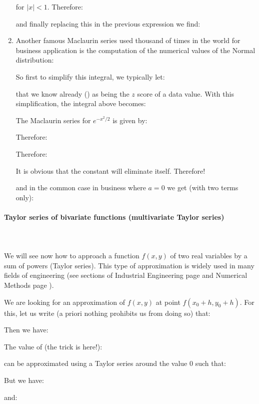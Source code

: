 \begin{enumerate}
		for $\vert x \vert < 1$. Therefore:
		
		and finally replacing this in the previous expression we find:
		
		
		\item  Another famous Maclaurin series used thousand of times in the world for business application is the computation of the numerical values of the Normal distribution:
		
		So first to simplify this integral, we typically let:
		
		that we know already () as being the $z$ score of a data value. With this simplification, the integral above becomes:
		
		The Maclaurin series for $e^{-x^2/2}$ is given by:
		
		Therefore:
		
		Therefore:
		
		It is obvious that the constant will eliminate itself. Therefore!
		
		and in the common case in business where $a=0$ we get (with two terms only):
		
	\end{enumerate}
	
	\pagebreak
	\paragraph{Taylor series of bivariate functions (multivariate Taylor series)}\label{multivariate taylor series}\mbox{}\\\\
	We will see now how to approach a function $f (x, y)$ of two real variables by a sum of powers (Taylor series). This type of approximation is widely used in many fields of engineering (see sections of Industrial Engineering page \pageref{bivariat taylor expansion doe} and Numerical Methods page \pageref{newton raphson method}).
	
	We are looking for an approximation of $f (x, y)$ at point $f(x_0+h,y_0+h)$. For this, let us write (a priori nothing prohibits us from doing so) that:
	
	Then we have:
	
	The value of (the trick is here!):
	
	can be approximated using a Taylor series around the value $0$ such that:
	
	But we have:
	
	and:
	
